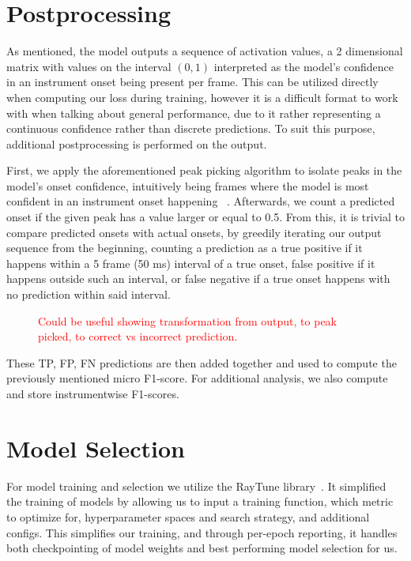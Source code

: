 \section{Postprocessing}

As mentioned, the model outputs a sequence of activation values, a 2 dimensional matrix with values on the interval $(0, 1)$ interpreted as the model's confidence in an instrument onset being present per frame. This can be utilized directly when computing our loss during training, however it is a difficult format to work with when talking about general performance, due to it rather representing a continuous confidence rather than discrete predictions. To suit this purpose, additional postprocessing is performed on the output.

First, we apply the aforementioned peak picking algorithm to isolate peaks in the model's onset confidence, intuitively being frames where the model is most confident in an instrument onset happening ~\cite{Bck2012EvaluatingTO, vogl2018multiinstrumentdrumtranscription}. Afterwards, we count a predicted onset if the given peak has a value larger or equal to 0.5. From this, it is trivial to compare predicted onsets with actual onsets, by greedily iterating our output sequence from the beginning, counting a prediction as a true positive if it happens within a 5 frame (50 ms) interval of a true onset, false positive if it happens outside such an interval, or false negative if a true onset happens with no prediction within said interval.

\begin{figure}[H]
    \centering
    \textcolor{red}{Could be useful showing transformation from output, to peak picked, to correct vs incorrect prediction.}
\end{figure}

These \gls{TP}, \gls{FP}, \gls{FN} predictions are then added together and used to compute the previously mentioned micro F1-score. For additional analysis, we also compute and store instrumentwise F1-scores.

\section{Model Selection}

For model training and selection we utilize the RayTune library~\cite{liaw2018tuneresearchplatformdistributed}. It simplified the training of models by allowing us to input a training function, which metric to optimize for, hyperparameter spaces and search strategy, and additional configs. This simplifies our training, and through per-epoch reporting, it handles both checkpointing of model weights and best performing model selection for us.

